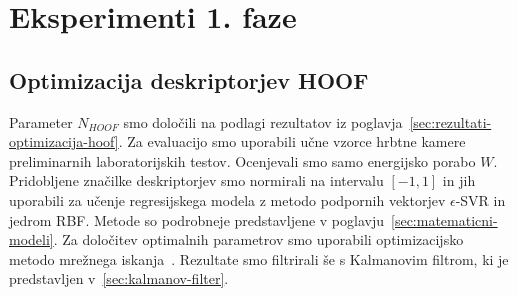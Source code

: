 \section{Eksperimenti 1. faze}

\subsection{Optimizacija deskriptorjev HOOF}\label{sec:optimizacija-hoof}
Parameter $N_{HOOF}$ smo določili na podlagi rezultatov iz poglavja~\ref{sec:rezultati-optimizacija-hoof}. Za evaluacijo smo uporabili učne vzorce hrbtne kamere preliminarnih laboratorijskih testov. Ocenjevali smo samo energijsko porabo $W$. Pridobljene značilke deskriptorjev smo normirali na intervalu $[-1,1]$ in jih uporabili za učenje regresijskega modela z metodo podpornih vektorjev $\epsilon$-SVR in jedrom RBF. Metode so podrobneje predstavljene v poglavju~\ref{sec:matematicni-modeli}. Za določitev optimalnih parametrov %
smo uporabili optimizacijsko metodo mrežnega iskanja~\cite{hsu2003practical}. Rezultate smo filtrirali še s Kalmanovim filtrom, ki je predstavljen v~\ref{sec:kalmanov-filter}.

